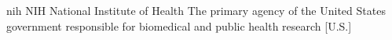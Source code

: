 \newglsXgovernment%
{nih}%
{NIH}%
{National Institute of Health}%
{The primary agency of the United States government responsible for biomedical and public health research \cite{website:National_Institutes_of_Health}}%
[U.S.]%